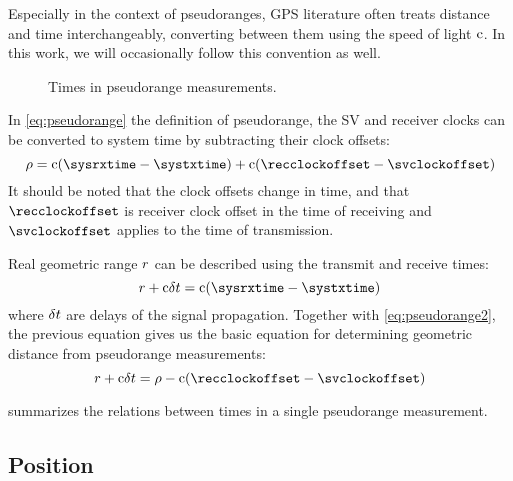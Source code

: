 Especially in the context of pseudoranges, GPS literature often treats distance and time
interchangeably, converting between them using the speed of light \(\mathrm{c}\).
In this work, we will occasionally follow this convention as well.

\begin{figure}[tb]
	\centering
	
	\caption{Times in pseudorange measurements.}
	\label{fig:pseudorange}
\end{figure}

In \eqref{eq:pseudorange} the definition of pseudorange, the SV and receiver clocks can be
converted to system time by subtracting their clock offsets:
\begin{equation}
	\label{eq:pseudorange2}
	\rho = \speedoflight (\sysrxtime - \systxtime) + \speedoflight (\recclockoffset - \svclockoffset)
\end{equation}
It should be noted that the clock offsets change in time, and that \(\recclockoffset\) is receiver clock
offset in the time of receiving and \(\svclockoffset\) applies to the time of transmission.

Real geometric range \(r\) can be described using the transmit and receive times:
\begin{equation}
	\geomrange + \speedoflight\geomrangedelays = \speedoflight (\sysrxtime - \systxtime)
\end{equation}
where \(\delta{t}\) are delays of the signal propagation.
Together with \eqref{eq:pseudorange2}, the previous equation gives us
the basic equation for determining geometric distance from pseudorange measurements:
\begin{equation}
    \label{eq:pseudorange4}
	\geomrange + \speedoflight\geomrangedelays = \rho - \speedoflight (\recclockoffset - \svclockoffset)
\end{equation}


 summarizes the relations between times in a single pseudorange measurement.

\subsection{Position}
\label{sec:gps-position}

